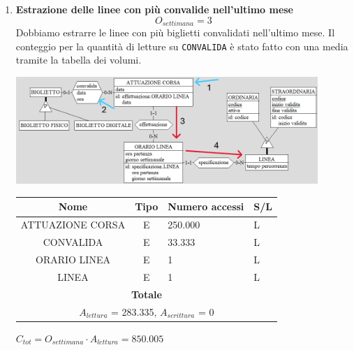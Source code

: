 \documentclass[12pt,a4paper]{report}
\begin{document}
\begin{enumerate}[label=\textbf{\arabic*}]
    \item \textbf{Estrazione delle linee con più convalide nell'ultimo mese} \label{op6} \\
    \[ {O_{settimana} = 3} \]
    Dobbiamo estrarre le linee con più biglietti convalidati nell'ultimo mese. Il conteggio per la quantità di letture su \texttt{CONVALIDA} è stato fatto con una media tramite la tabella dei volumi.
    \begin{center}
	\includegraphics[width=0.9\textwidth]{op_6}
	\end{center}
    \begin{table}[H]
    \centering
    \begin{tabular}{|c|c|l|l|}
    \hline
    \textbf{Nome} & \textbf{Tipo} & \textbf{Numero accessi} & \textbf{S/L} \\
    \hline
    ATTUAZIONE CORSA & E & 250.000 & L \\
    \hline
    CONVALIDA & E & 33.333 & L \\
    \hline
    ORARIO LINEA & E & 1 & L \\
    \hline
    LINEA & E & 1 & L \\
    \hline
    \multicolumn{4}{c}{\textbf{Totale}} \\
    \multicolumn{4}{c}{${A_{lettura}}$ = 283.335, ${A_{scrittura}}$ = 0} \\
    \hline
    \end{tabular}
    \end{table}
    \begin{center}
    ${C_{tot} = {O_{settimana}}\cdot {A_{lettura}} = 850.005}$
    \end{center}



\end{enumerate}
\end{document}
